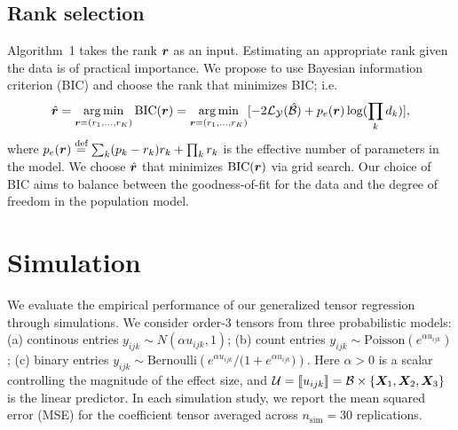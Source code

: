 \documentclass{article}
\theoremstyle{plain}
\theoremstyle{definition}
\begin{document}
\vspace{-.2cm}
\subsection{Rank selection}\label{sec:tuning}
\vspace{-.2cm}
Algorithm~1 takes the rank $\bm{r}$ as an input. Estimating an appropriate rank given the data is of practical importance. We propose to use Bayesian information criterion (BIC) and choose the rank that minimizes BIC; i.e.
\begin{align}\label{eq:BIC}
\hat {\bm{r}}=\operatorname*{arg\,min}_{\bm{r}=(r_1,\ldots,r_K)} \text{BIC}(\bm{r}) =\operatorname*{arg\,min}_{\bm{r}=(r_1,\ldots,r_K)}[-2\mathcal{L}_{\mathcal{Y}}(\hat {\mathcal{B}})+p_e(\bm{r})\log (\prod_k d_k)],
\end{align}
where $p_e(\bm{r})\stackrel{\text{def}}{=}\sum_k (p_k-r_k)r_k+\prod_k r_k$ is the effective number of parameters in the model. We choose $\hat {\bm{r}}$ that minimizes $\text{BIC}(\bm{r})$ via grid search. Our choice of BIC aims to balance between the goodness-of-fit for the data and the degree of freedom in the population model. 


\section{Simulation}\label{sec:simulation}
We evaluate the empirical performance of our generalized tensor regression through simulations. We consider order-3 tensors from %
three probabilistic models: (a) continous entries $y_{ijk}\sim N\left(\alpha u_{ijk}, 1\right)$; (b) count entries $y_{ijk}\sim\text{Poisson}\left( e^{\alpha u_{ijk}}\right)$; (c) binary entries $y_{ijk}\sim \text{Bernoulli}\left( {e^{\alpha u_{ijk}} /( 1+e^{\alpha u_{ijk}}})\right)$. Here $\alpha>0$ is a scalar controlling the magnitude of the effect size, and $\mathcal{U}=\llbracket u_{ijk} \rrbracket=\mathcal{B}\times\{\bm X_1,\bm X_2,\bm X_3\}$ is the linear predictor. In each simulation study, we report the mean squared error (MSE) for the coefficient tensor averaged across $n_{\text{sim}}=30$ replications. 
\end{document}
